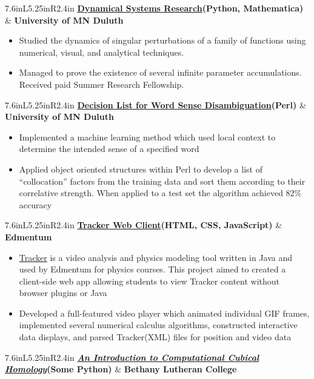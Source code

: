 \documentclass[letterpaper,10pt]{article}
\newcommand{\resitem}[1]{\item[$\triangleright$] #1 

\vspace{-.1in}
}
\newcommand{\ressubheadingg}[2]{
	\begin{tabular*}{7.6in}{L{5.25in}R{2.4in}}
			\textbf{#1} & \textbf{#2}
	\end{tabular*}
}
\begin{document}
		\vspace{.1in}
		\ressubheadingg{\href{https://www.researchgate.net/publication/281248352_Infinite_Levels_of_Complexity_in_a_Family_of_One-Dimensional_Singular_Dynamical_Systems}{Dynamical Systems Research}(Python, Mathematica)}{University of MN Duluth}
			\vspace{-.25in}
			\begin{itemize}
				\resitem{Studied the dynamics of singular perturbations of a family of functions using numerical, visual, and analytical techniques.}
				\resitem{Managed to prove the existence of several infinite parameter accumulations. Received paid Summer Research Fellowship.}
			\end{itemize}
		\vspace{.1in}
		\ressubheadingg{\href{https://github.com/EvanOman/nlp-decision-list}{Decision List for Word Sense Disambiguation}(Perl)}{University of MN Duluth}
			\vspace{-.25in}
			\begin{itemize}
				\resitem{Implemented a machine learning method which used local context to determine the intended sense of a specified word}
				\resitem{Applied object oriented structures within Perl to develop a list of ``collocation'' factors from the training data and sort them according to their correlative strength. When applied to a test set the algorithm achieved 82\% accuracy}
			\end{itemize}
		\vspace{.1in}
		\ressubheadingg{\href{https://github.com/EvanOman/Tracker-Browser-Client}{Tracker Web Client}(HTML, CSS, JavaScript)}{Edmentum}
			\vspace{-.25in}
			\begin{itemize}
				\resitem{\href{https://www.cabrillo.edu/~dbrown/tracker/}{Tracker} is a video analysis and physics modeling tool written in Java and used by Edmentum for physics courses. This project aimed to created a client-side web app allowing students to view Tracker content without browser plugins or Java}
				\resitem{Developed a full-featured video player which animated individual GIF frames, implemented several numerical calculus algorithms, constructed interactive data displays, and parsed Tracker(XML) files for position and video data}
			\end{itemize}
		\vspace{.1in}
		\ressubheadingg{\href{https://drive.google.com/file/d/0B5IOv9SzzDlvdnowZVpKRzhXOU0/edit?usp=sharing}{\textit{An Introduction to Computational Cubical Homology}}(Some Python)}{Bethany Lutheran College}
\end{document}
